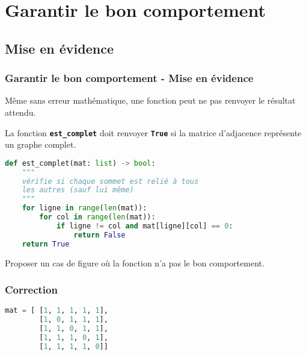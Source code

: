\documentclass[svgnames,11pt]{beamer}
\begin{document}
\section{Garantir le bon comportement}
\subsection{Mise en évidence}
\begin{frame}
    \frametitle{Garantir le bon comportement - Mise en évidence}

    \begin{aretenir}[]
        Même sans erreur mathématique, une fonction peut ne pas renvoyer le résultat attendu.
    \end{aretenir}
\end{frame}

\begin{frame}[fragile]
    \begin{activite}
        La fonction \textbf{\texttt{est\_complet}} doit renvoyer \textbf{\texttt{True}} si la matrice d'adjacence représente un graphe complet.
        \begin{center}
            \begin{lstlisting}[language=Python , basicstyle=\ttfamily\small, xleftmargin=0.2em, xrightmargin=-3em]
def est_complet(mat: list) -> bool:
    """
    vérifie si chaque sommet est relié à tous
    les autres (sauf lui même)
    """
    for ligne in range(len(mat)):
        for col in range(len(mat)):
            if ligne != col and mat[ligne][col] == 0:
                return False
    return True
\end{lstlisting}
        \end{center}
        Proposer un cas de figure où la fonction n'a pas le bon comportement.
    \end{activite}
\end{frame}
\begin{frame}[fragile]
    \frametitle{Correction}

    \begin{center}
        \begin{lstlisting}[language=Python , basicstyle=\ttfamily\small, xleftmargin=2em, xrightmargin=2em]
mat = [ [1, 1, 1, 1, 1],
        [1, 0, 1, 1, 1],
        [1, 1, 0, 1, 1],
        [1, 1, 1, 0, 1],
        [1, 1, 1, 1, 0]]
\end{lstlisting}
        \label{CODE}
    \end{center}

\end{frame}
\end{document}
